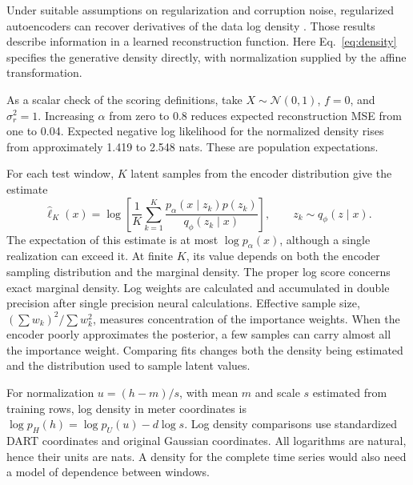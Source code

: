 \documentclass{article}
\begin{document}
Under suitable assumptions on regularization and corruption noise, regularized autoencoders can recover derivatives of the data log density \citep{AlainBengio2014WhatRegularizedAutoEncodersLearn}. Those results describe information in a learned reconstruction function. Here Eq.~\ref{eq:density} specifies the generative density directly, with normalization supplied by the affine transformation.

As a scalar check of the scoring definitions, take $X\sim\mathcal{N}(0,1)$, $f=0$, and $\sigma_r^2=1$. Increasing $\alpha$ from zero to 0.8 reduces expected reconstruction MSE from one to 0.04. Expected negative log likelihood for the normalized density rises from approximately 1.419 to 2.548 nats. These are population expectations.

For each test window, $K$ latent samples from the encoder distribution give the estimate
\begin{equation}
\widehat\ell_K(x)=\log\left[\frac1K\sum_{k=1}^K
\frac{p_\alpha(x\mid z_k)p(z_k)}{q_\phi(z_k\mid x)}\right],
\qquad z_k\sim q_\phi(z\mid x).
\end{equation}
The expectation of this estimate is at most $\log p_\alpha(x)$, although a single realization can exceed it. At finite $K$, its value depends on both the encoder sampling distribution and the marginal density. The proper log score concerns exact marginal density. Log weights are calculated and accumulated in double precision after single precision neural calculations. Effective sample size, $(\sum w_k)^2/\sum w_k^2$, measures concentration of the importance weights. When the encoder poorly approximates the posterior, a few samples can carry almost all the importance weight. Comparing fits changes both the density being estimated and the distribution used to sample latent values.

For normalization $u=(h-m)/s$, with mean $m$ and scale $s$ estimated from training rows, log density in meter coordinates is $\log p_H(h)=\log p_U(u)-d\log s$. Log density comparisons use standardized DART coordinates and original Gaussian coordinates. All logarithms are natural, hence their units are nats. A density for the complete time series would also need a model of dependence between windows.
\end{document}
